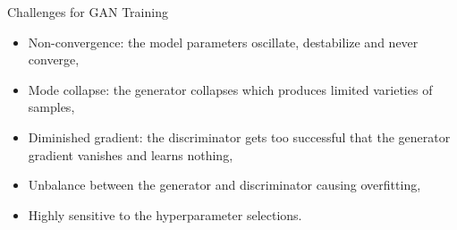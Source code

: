 \begin{frame} {Challenges for GAN Training}

  \begin{itemize}
    \item Non-convergence: the model parameters oscillate, destabilize and never converge,
    \item Mode collapse: the generator collapses which produces limited varieties of samples,
     \item Diminished gradient: the discriminator gets too successful that the generator gradient vanishes and learns nothing,
     \item Unbalance between the generator and discriminator causing overfitting, 
     \item Highly sensitive to the hyperparameter selections.
  \end{itemize}
\end{frame}



